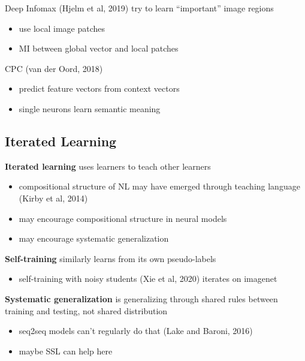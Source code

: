 \documentclass[]{article}
\theoremstyle{definition}
\begin{document}
    Deep Infomax (Hjelm et al, 2019) try to learn ``important'' image regions
    \begin{itemize}
        \item use local image patches
        \item MI between global vector and local patches
    \end{itemize}

    CPC (van der Oord, 2018)
    \begin{itemize}
        \item predict feature vectors from context vectors
        \item single neurons learn semantic meaning
    \end{itemize}

    \subsection{Iterated Learning}%
    \label{sub:iterated_learning}

    \textbf{Iterated learning} uses learners to teach other learners
    \begin{itemize}
        \item compositional structure of NL may have emerged through teaching language (Kirby et al, 2014)
        \item may encourage compositional structure in neural models
        \item may encourage systematic generalization
    \end{itemize}

    \textbf{Self-training} similarly learns from its own pseudo-labels
    \begin{itemize}
        \item self-training with noisy students (Xie et al, 2020) iterates on imagenet
    \end{itemize}

    \textbf{Systematic generalization} is generalizing through shared rules between training and testing, not shared distribution
    \begin{itemize}
        \item seq2seq models can't regularly do that (Lake and Baroni, 2016)
        \item maybe SSL can help here
    \end{itemize}
\end{document}

